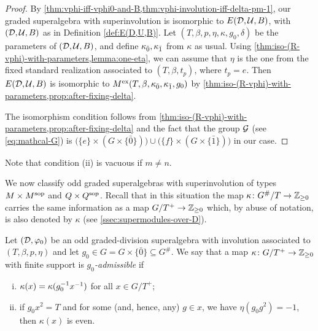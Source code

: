 \begin{proof}
    By \cref{thm:vphi-iff-vphi0-and-B,thm:vphi-involution-iff-delta-pm-1}, our graded superalgebra with superinvolution is isomorphic to $E(\mathcal{D}, \mathcal U, B)$, with $(\mathcal{D}, \mathcal U, B)$ as in Definition \ref{def:E(D,U,B)}. 
    Let $(T, \beta, p, \eta, \kappa, g_0, \delta)$ be the parameters of $(\mathcal{D}, \mathcal U, B)$, and define $\kappa_{\bar{0}}, \kappa_{\bar{1}}$ from $\kappa$ as usual. 
    Using \cref{thm:iso-(R-vphi)-with-parameters,lemma:one-eta}, we can assume that $\eta$ is the one from the fixed standard realization associated to $(T, \beta, t_p)$, where $t_p = e$. 
    Then $E(\mathcal{D}, \mathcal U, B)$ is isomorphic to $M^{\mathrm{ex}} (T, \beta, \kappa_{\bar{0}}, \kappa_{\bar{1}}, g_0)$ by \cref{thm:iso-(R-vphi)-with-parameters,prop:after-fixing-delta}. 
    
    The isomorphism condition follows from \cref{thm:iso-(R-vphi)-with-parameters,prop:after-fixing-delta} and the fact that the group $\mathcal G$ (see \cref{eq:mathcal-G}) is $\big( \{e\} \times (G \times \{ \bar 0 \}) \big) \cup \big( \{f\} \times (G \times \{ \bar 1 \}) \big)$ in our case.
\end{proof}

\begin{remark}
    Note that condition (ii) is vacuous if $m \neq n$. 
\end{remark}


We now classify odd graded superalgebras with superinvolution of types $M\times M^{\mathrm{sop}}$ and $Q \times Q^{\mathrm{sop}}$. 
Recall that in this situation the map $\kappa\colon G^\#/T \to \mathbb{Z}_{\geq 0}$ carries the same information as a map $G/T^+ \to \mathbb{Z}_{\geq 0}$ which, by abuse of notation, is also denoted by $\kappa$ (see \cref{ssec:supermodules-over-D}). 


\begin{defi}\label{defi:odd-D-kappa-g_0-admissible}
    Let $(\mathcal{D}, \varphi_0)$ be an odd graded-division superalgebra with involution associated to $(T, \beta, p, \eta)$ and let $g_0 \in G = G \times \{ \bar 0 \} \subseteq G^\#$. 
    We say that a map $\kappa\colon G/T^+ \to \mathbb{Z}_{\geq 0}$ with finite support is \emph{$g_0$-admissible} if
	\begin{enumerate}[(i)]
		\item $\kappa(x) = \kappa(g_0^{-1} x^{-1})$ for all $x \in G/T^+$;
		\item if $g_0 x^2 = T$ and 
		for some (and, hence, any) $g\in x$, we have $\eta(g_0g^2) = -1$, then $\kappa (x)$ is even.
	\end{enumerate}
\end{defi}

